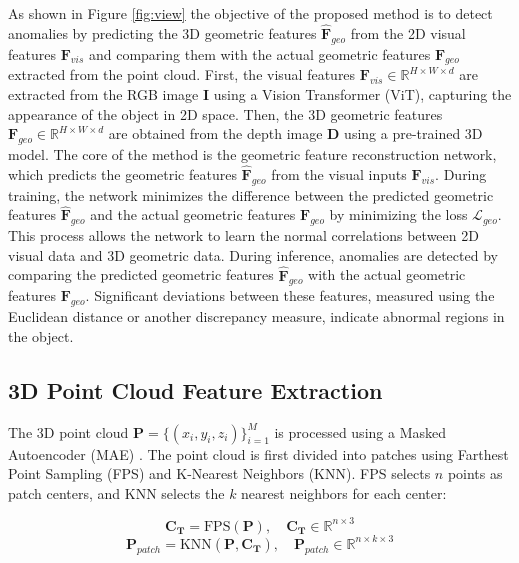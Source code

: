 As shown in Figure \ref{fig:view} the objective of the proposed method is to detect anomalies by predicting the 3D geometric features $\hat{\mathbf{F}}_{geo}$ from the 2D visual features $\mathbf{F}_{vis}$ and comparing them with the actual geometric features $\mathbf{F}_{geo}$ extracted from the point cloud. First, the visual features $\mathbf{F}_{vis} \in \mathbb{R}^{H \times W \times d}$ are extracted from the RGB image $\mathbf{I}$ using a Vision Transformer (ViT), capturing the appearance of the object in 2D space. Then, the 3D geometric features $\mathbf{F}_{geo} \in \mathbb{R}^{H \times W \times d}$ are obtained from the depth image $\mathbf{D}$ using a pre-trained 3D model. The core of the method is the geometric feature reconstruction network, which predicts the geometric features $\hat{\mathbf{F}}_{geo}$ from the visual inputs $\mathbf{F}_{vis}$. During training, the network minimizes the difference between the predicted geometric features $\hat{\mathbf{F}}_{geo}$ and the actual geometric features $\mathbf{F}_{geo}$ by minimizing the loss $\mathcal{L}_{geo}$. This process allows the network to learn the normal correlations between 2D visual data and 3D geometric data. During inference, anomalies are detected by comparing the predicted geometric features $\hat{\mathbf{F}}_{geo}$ with the actual geometric features $\mathbf{F}_{geo}$. Significant deviations between these features, measured using the Euclidean distance or another discrepancy measure, indicate abnormal regions in the object.

\subsection*{3D Point Cloud Feature Extraction}

The 3D point cloud $\mathbf{P} = \{(x_i, y_i, z_i)\}_{i=1}^{M}$ is processed using a Masked Autoencoder (MAE) \cite{pang2022masked}. The point cloud is first divided into patches using Farthest Point Sampling (FPS) and K-Nearest Neighbors (KNN). FPS selects $n$ points as patch centers, and KNN selects the $k$ nearest neighbors for each center:

\begin{equation}
    \mathbf{C_T} = \text{FPS}(\mathbf{P}), \quad \mathbf{C_T} \in \mathbb{R}^{n \times 3}
\end{equation}
\begin{equation}
    \mathbf{P}_{patch} = \text{KNN}(\mathbf{P}, \mathbf{C_T}), \quad \mathbf{P}_{patch} \in \mathbb{R}^{n \times k \times 3}
\end{equation}

